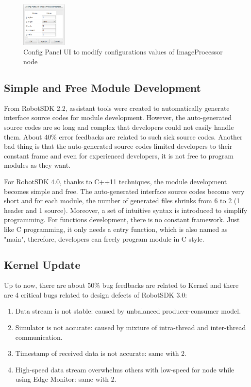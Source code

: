 \documentclass[a4paper,10pt]{book}
\begin{document}
\begin{figure}
 \centering
 \includegraphics[width=0.2\textwidth]{img/configvalue.png}
 \caption{Config Panel UI to modify configurations values of ImageProcessor node}
 \label{fig:configvalue}
\end{figure}

\subsection{Simple and Free Module Development}

From RobotSDK 2.2, assistant tools were created to automatically generate interface source codes for module development. However, the auto-generated source codes are so long and complex that developers could not easily handle them. About 40\% error feedbacks are related to such sick source codes. Another bad thing is that the auto-generated source codes limited developers to their constant frame and even for experienced developers, it is not free to program modules as they want.

For RobotSDK 4.0, thanks to C++11 techniques, the module development becomes simple and free. The auto-generated interface source codes become very short and for each module, the number of generated files shrinks from 6 to 2 (1 header and 1 source). Moreover, a set of intuitive syntax is introduced to simplify programming. For functions development, there is no constant framework. Just like C programming, it only needs a entry function, which is also named as "main", therefore, developers can freely program module in C style.

\subsection{Kernel Update}

Up to now, there are about 50\% bug feedbacks are related to Kernel and there are 4 critical bugs related to design defects of RobotSDK 3.0:
\begin{enumerate}
 \item Data stream is not stable: caused by unbalanced producer-consumer model.
 \item Simulator is not accurate: caused by mixture of intra-thread and inter-thread communication.
 \item Timestamp of received data is not accurate: same with 2.
 \item High-speed data stream overwhelms others with low-speed for node while using Edge Monitor: same with 2.
\end{enumerate}
\end{document}
